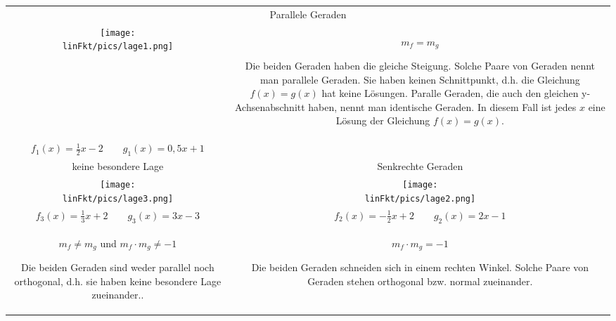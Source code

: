 
\begin{tabular}{c|c}
	\multicolumn{2}{c}{\Large\textcolor{loes}{Parallele Geraden}} \\ \texttt{[image: \\linFkt/pics/lage1.png]} &
	\parbox[b]{0.46\textwidth}{\raggedright
		\begin{tcolorbox}\centering
			\textcolor{loestc}{$m_f=m_g$}
		\end{tcolorbox}
		\textcolor{loes}{Die beiden Geraden haben die gleiche Steigung. Solche Paare von Geraden nennt man parallele Geraden. Sie haben keinen Schnittpunkt, d.h. die Gleichung $f(x)=g(x)$ hat keine Lösungen. Paralle Geraden, die auch den gleichen y-Achsenabschnitt haben, nennt man identische Geraden. In diesem Fall ist jedes $x$ eine Lösung der Gleichung $f(x)=g(x)$}.\vspace{1cm}
	}
	\\
	$f_1(x)=\tfrac{1}{2}x-2\qquad g_1(x)=0,5x+1$ & \\
	\midrule
	{\Large\textcolor{loes}{keine besondere Lage}} & {\Large\textcolor{loes}{Senkrechte Geraden}}\\
	\texttt{[image: \\linFkt/pics/lage3.png]} &
	\texttt{[image: \\linFkt/pics/lage2.png]}\\
	$f_3(x)=\tfrac{1}{3}x+2\qquad g_3(x)=3x-3$ &
	$f_2(x)=-\tfrac{1}{2}x+2\qquad g_2(x)=2x-1$\\
	\parbox[t][][t]{0.46\textwidth}{\raggedright
	\begin{tcolorbox}\centering
		\textcolor{loestc}{$m_f\neq m_g$ und $m_f\cdot m_g\neq-1$}
	\end{tcolorbox}
	\textcolor{loes}{Die beiden Geraden sind weder parallel noch orthogonal, d.h. sie haben keine besondere Lage zueinander.}.}&
	\parbox[t][][t]{0.46\textwidth}{\raggedright
	\begin{tcolorbox}\centering
		\textcolor{loestc}{$m_f\cdot m_g=-1$}
	\end{tcolorbox}
	\textcolor{loes}{Die beiden Geraden schneiden sich in einem rechten Winkel. Solche Paare von Geraden stehen orthogonal bzw. normal zueinander.
	}}\\
\end{tabular}